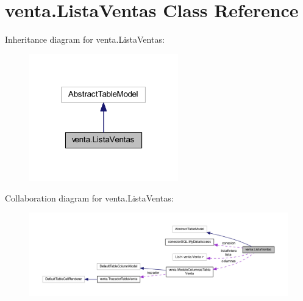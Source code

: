 \hypertarget{classventa_1_1_lista_ventas}{}\section{venta.\+Lista\+Ventas Class Reference}
\label{classventa_1_1_lista_ventas}


Inheritance diagram for venta.\+Lista\+Ventas\+:
\nopagebreak
\begin{figure}[H]
\begin{center}
\leavevmode
\includegraphics[width=183pt]{classventa_1_1_lista_ventas__inherit__graph}
\end{center}
\end{figure}


Collaboration diagram for venta.\+Lista\+Ventas\+:
\nopagebreak
\begin{figure}[H]
\begin{center}
\leavevmode
\includegraphics[width=350pt]{classventa_1_1_lista_ventas__coll__graph}
\end{center}
\end{figure}
